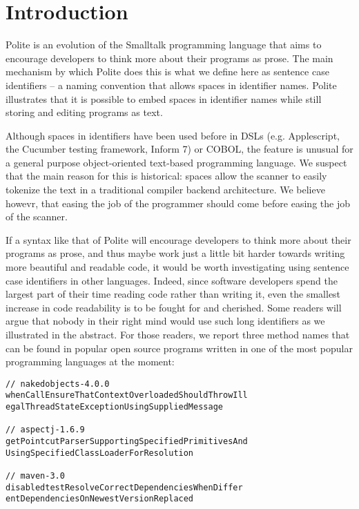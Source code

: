 

\section{Introduction}

Polite is an evolution of the Smalltalk programming language that aims to encourage developers to think more about their programs as prose. The main mechanism by which Polite does this is what we define here as sentence case identifiers -- a naming convention that allows spaces in identifier names. Polite illustrates that it is possible to embed spaces in identifier names while still storing and editing programs as text. 

Although spaces in identifiers have been used before in DSLs (e.g. Applescript, the Cucumber testing framework, Inform 7) or COBOL, the feature is unusual for a general purpose object-oriented text-based programming language. We suspect that the main reason for this is historical: spaces allow the scanner to easily tokenize the text in a traditional compiler backend architecture. We believe howevr, that easing the job of the programmer should come before easing the job of the scanner. 

If a syntax like that of Polite will encourage developers to think more about their programs as prose, and thus maybe work just a little bit harder towards writing more beautiful and readable code, it would be worth investigating using sentence case identifiers in other languages. Indeed, since software developers spend the largest part of their time reading code rather than writing it, even the smallest increase in code readability is to be fought for and cherished.
Some readers will argue that nobody in their right mind would use such long identifiers as we illustrated in the abstract. For those readers, we report three method names that can be found in popular open source programs written in one of the most popular programming languages at the moment: 


\begin{verbatim}
// nakedobjects-4.0.0
whenCallEnsureThatContextOverloadedShouldThrowIll
egalThreadStateExceptionUsingSuppliedMessage 

// aspectj-1.6.9
getPointcutParserSupportingSpecifiedPrimitivesAnd
UsingSpecifiedClassLoaderForResolution 

// maven-3.0
disabledtestResolveCorrectDependenciesWhenDiffer
entDependenciesOnNewestVersionReplaced 
\end{verbatim}




